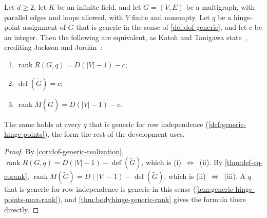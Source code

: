 \begin{proposition}[KT Proposition 2.3]
  \label{prop:rigidity-matrix-prop11}
  \leanok
  Let $d \ge 2$, let $K$ be an infinite field, and let $G = (V, E)$ be
  a multigraph, with parallel edges and loops allowed, with $V$ finite
  and nonempty. Let $q$ be a hinge-point assignment of $G$ that is
  generic in the sense of \cref{def:dof-generic}, and let $c$ be an
  integer. Then the following are equivalent, as Katoh and Tanigawa
  state~\cite[p.~655]{katohTanigawa2011}, crediting Jackson and
  Jord\'an~\cite{jacksonJordan2009}:
  \begin{enumerate}
    \item[(i)] $\operatorname{rank} R(G,q) = D(|V|-1) - c$;
    \item[(ii)] $\operatorname{def}(\tilde G) = c$;
    \item[(iii)] $\operatorname{rank} M(\tilde G) = D(|V|-1) - c$.
  \end{enumerate}
  The same holds at every $q$ that is generic for row independence
  (\cref{def:generic-hinge-points}), the form the rest of the
  development uses.
\end{proposition}
\begin{proof}
  \leanok
  By \cref{cor:dof-generic-realization},
  $\operatorname{rank} R(G,q) = D(|V|-1) - \operatorname{def}(\tilde G)$,
  which is (i)~$\Leftrightarrow$~(ii). By \cref{thm:def-eq-corank},
  $\operatorname{rank} M(\tilde G) = D(|V|-1) - \operatorname{def}(\tilde G)$,
  which is (ii)~$\Leftrightarrow$~(iii). A $q$ that is generic for row
  independence is generic in this sense
  (\cref{lem:generic-hinge-points-max-rank}), and
  \cref{thm:bodyhinge-generic-rank} gives the formula there directly.
\end{proof}


